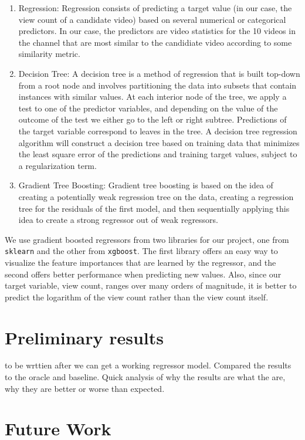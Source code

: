 \documentclass[12pt]{article}
\theoremstyle{definition}
\theoremstyle{remark}
\begin{document}
\begin{enumerate}
\item Regression: Regression consists of predicting a target value (in our case,
  the view count of a candidate video) based on several numerical or categorical
  predictors. In our case, the predictors are video statistics for the 10 videos
  in the channel that are most similar to the candidiate video according to some
  similarity metric.
\item Decision Tree: A decision tree is a method of regression that is built
  top-down from a root node and involves partitioning the data into subsets that
  contain instances with similar values. At each interior node of the tree, we
  apply a test to one of the predictor variables, and depending on the value of
  the outcome of the test we either go to the left or right subtree. Predictions
  of the target variable correspond to leaves in the tree. A decision tree
  regression algorithm will construct a decision tree based on training data
  that minimizes the least square error of the predictions and training target
  values, subject to a regularization term.
\item Gradient Tree Boosting: Gradient tree boosting is based on the idea of
  creating a potentially weak regression tree on the data, creating a regression
  tree for the residuals of the first model, and then sequentially applying this
  idea to create a strong regressor out of weak regressors.
\end{enumerate}
We use gradient boosted regressors from two libraries for our project, one from
\texttt{sklearn} and the other from \texttt{xgboost}. The first library offers
an easy way to visualize the feature importances that are learned by the
regressor, and the second offers better performance when predicting new values.
Also, since our target variable, view count, ranges over many orders of
magnitude, it is better to predict the logarithm of the view count rather than
the view count itself.

\section{Preliminary results}

to be wrttien after we can get a working regressor model. Compared the results to the oracle and baseline.  Quick analysis of why the results are what the are, why they are better or worse than expected.


\section{Future Work}
\end{document}
